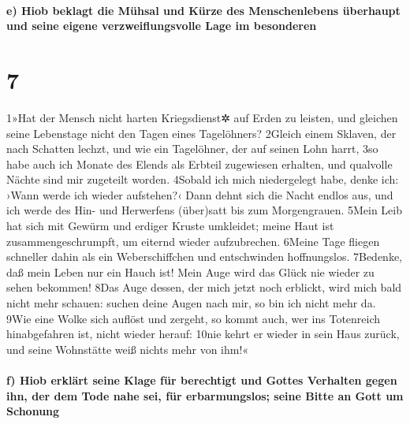 \hypertarget{e-hiob-beklagt-die-muxfchsal-und-kuxfcrze-des-menschenlebens-uxfcberhaupt-und-seine-eigene-verzweiflungsvolle-lage-im-besonderen}{%
\paragraph{e) Hiob beklagt die Mühsal und Kürze des Menschenlebens
überhaupt und seine eigene verzweiflungsvolle Lage im
besonderen}\label{e-hiob-beklagt-die-muxfchsal-und-kuxfcrze-des-menschenlebens-uxfcberhaupt-und-seine-eigene-verzweiflungsvolle-lage-im-besonderen}}

\hypertarget{section-6}{%
\section{7}\label{section-6}}

1»Hat der Mensch nicht harten Kriegsdienst✲ auf Erden zu leisten, und
gleichen seine Lebenstage nicht den Tagen eines Tagelöhners? 2Gleich
einem Sklaven, der nach Schatten lechzt, und wie ein Tagelöhner, der auf
seinen Lohn harrt, 3so habe auch ich Monate des Elends als Erbteil
zugewiesen erhalten, und qualvolle Nächte sind mir zugeteilt worden.
4Sobald ich mich niedergelegt habe, denke ich: ›Wann werde ich wieder
aufstehen?‹ Dann dehnt sich die Nacht endlos aus, und ich werde des Hin-
und Herwerfens (über)satt bis zum Morgengrauen. 5Mein Leib hat sich mit
Gewürm und erdiger Kruste umkleidet; meine Haut ist zusammengeschrumpft,
um eiternd wieder aufzubrechen. 6Meine Tage fliegen schneller dahin als
ein Weberschiffchen und entschwinden hoffnungslos. 7Bedenke, daß mein
Leben nur ein Hauch ist! Mein Auge wird das Glück nie wieder zu sehen
bekommen! 8Das Auge dessen, der mich jetzt noch erblickt, wird mich bald
nicht mehr schauen: suchen deine Augen nach mir, so bin ich nicht mehr
da. 9Wie eine Wolke sich auflöst und zergeht, so kommt auch, wer ins
Totenreich hinabgefahren ist, nicht wieder herauf: 10nie kehrt er wieder
in sein Haus zurück, und seine Wohnstätte weiß nichts mehr von ihm!«

\hypertarget{f-hiob-erkluxe4rt-seine-klage-fuxfcr-berechtigt-und-gottes-verhalten-gegen-ihn-der-dem-tode-nahe-sei-fuxfcr-erbarmungslos-seine-bitte-an-gott-um-schonung}{%
\paragraph{f) Hiob erklärt seine Klage für berechtigt und Gottes
Verhalten gegen ihn, der dem Tode nahe sei, für erbarmungslos; seine
Bitte an Gott um
Schonung}\label{f-hiob-erkluxe4rt-seine-klage-fuxfcr-berechtigt-und-gottes-verhalten-gegen-ihn-der-dem-tode-nahe-sei-fuxfcr-erbarmungslos-seine-bitte-an-gott-um-schonung}}

